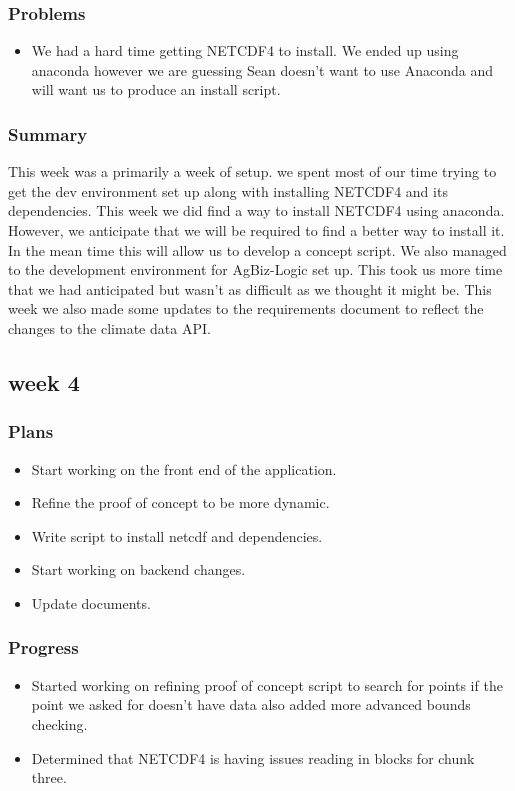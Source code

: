 \documentclass[onecolumn, draftclsnofoot,10pt, compsoc]{article}
\begin{document}
			\subsubsection{Problems}
				\begin{itemize}
					\item We had a hard time getting NETCDF4 to install. We ended up using anaconda however we are guessing Sean doesn't want to use Anaconda and will want us to produce an install script.\\
				\end{itemize}
			\subsubsection{Summary}
			This week was a primarily a week of setup. we spent most of our time trying to get the dev environment set up along with installing NETCDF4 and its dependencies. This week we did find a way to install NETCDF4 using anaconda. However, we anticipate that we will be required to find a better way to install it. In the mean time this will allow us to develop a concept script. We also managed to the development environment for AgBiz-Logic set up. This took us more time that we had anticipated but wasn't as difficult as we thought it might be. This week we also made some updates to the requirements document to reflect the changes to the climate data API.\\

		\subsection{week 4}
			\subsubsection{Plans}
				\begin{itemize}
					\item Start working on the front end of the application.
					\item Refine the proof of concept to be more dynamic.
					\item Write script to install netcdf and dependencies.
					\item Start working on backend changes.
					\item Update documents.
				\end{itemize}
			\subsubsection{Progress}
				\begin{itemize}
					\item Started working on refining proof of concept script to search for points if the point we asked for doesn't have data also added more advanced bounds checking.
					\item Determined that NETCDF4 is having issues reading in blocks for chunk three.
				\end{itemize}
\end{document}
